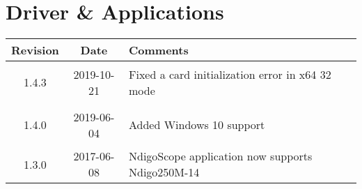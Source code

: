 \section{Driver \& Applications}
\begin{tabularx}{\textwidth}{|c|c|X|}
    \hline
    Revision & Date & Comments\\
    \hline\hline
    \hypertarget{drvrev}{1.4.3} & 2019-10-21 & Fixed a card initialization error in x64 32 mode\\
    \hline    
    \hypertarget{drvrev}{1.4.0} & 2019-06-04 & Added Windows 10 support\\
    \hline
    1.3.0 & 2017-06-08 & NdigoScope application now supports Ndigo250M-14\\
    \hline
\end{tabularx}